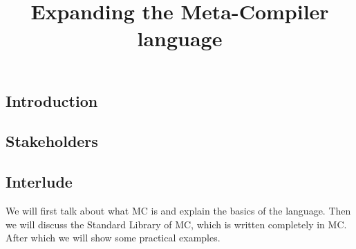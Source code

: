 


\begin{multicols}{3}
\title{Expanding the Meta-Compiler language}
\author{\writer}




\setcounter{tocdepth}{2}
\tableofcontents
\cleardoublepage
{}
\addtocounter{page}{4}


\part{Introduction}

\chapter{Stakeholders}

\chapter{Interlude}

We will first talk about what MC is and explain the basics of the language.
Then we will discuss the Standard Library of MC, which is written completely in MC.
After which we will show some practical examples.



\end{multicols}
